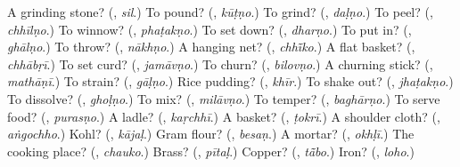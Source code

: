 \begin{tcolorbox}[breakable,colback=teal!4,colframe=teal!35!black,title={Before you move on}]
A grinding stone? (\textbf{}, \emph{sil}.) To pound? (\textbf{}, \emph{kūṭṇo}.) To grind? (\textbf{}, \emph{daḷṇo}.) To peel? (\textbf{}, \emph{chhīlṇo}.) To winnow? (\textbf{}, \emph{phaṭakṇo}.) To set down? (\textbf{}, \emph{dharṇo}.) To put in? (\textbf{}, \emph{ghālṇo}.) To throw? (\textbf{}, \emph{nākhṇo}.) A hanging net? (\textbf{}, \emph{chhī̃ko}.) A flat basket? (\textbf{}, \emph{chhābṛī}.) To set curd? (\textbf{}, \emph{jamāvṇo}.) To churn? (\textbf{}, \emph{bilovṇo}.) A churning stick? (\textbf{}, \emph{mathāṇī}.) To strain? (\textbf{}, \emph{gāḷṇo}.) Rice pudding? (\textbf{}, \emph{khīr}.) To shake out? (\textbf{}, \emph{jhaṭakṇo}.) To dissolve? (\textbf{}, \emph{ghoḷṇo}.) To mix? (\textbf{}, \emph{milāvṇo}.) To temper? (\textbf{}, \emph{baghārṇo}.) To serve food? (\textbf{}, \emph{purasṇo}.) A ladle? (\textbf{}, \emph{kaṛchhī}.) A basket? (\textbf{}, \emph{ṭokrī}.) A shoulder cloth? (\textbf{}, \emph{aṅgochho}.) Kohl? (\textbf{}, \emph{kājaḷ}.) Gram flour? (\textbf{}, \emph{besaṇ}.) A mortar? (\textbf{}, \emph{okhḷī}.) The cooking place? (\textbf{}, \emph{chauko}.) Brass? (\textbf{}, \emph{pītaḷ}.) Copper? (\textbf{}, \emph{tā̃bo}.) Iron? (\textbf{}, \emph{loho}.)
\end{tcolorbox}
